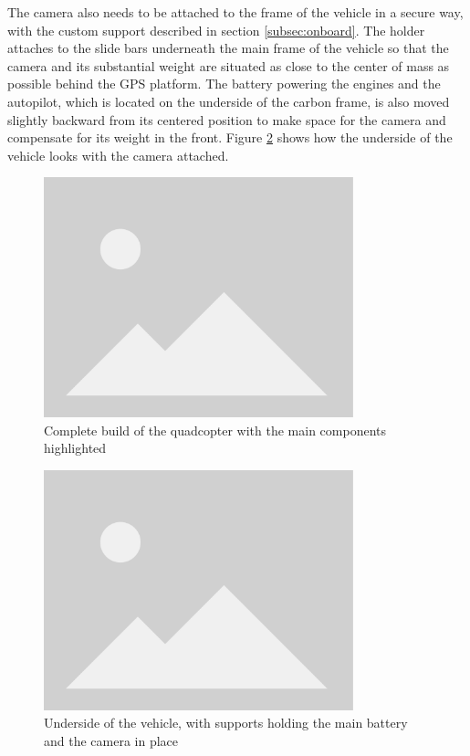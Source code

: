 The camera also needs to be attached to the frame of the vehicle in a secure way, with the custom support described in section \ref{subsec:onboard}.
The holder attaches to the slide bars underneath the main frame of the vehicle so that the camera and its substantial weight are situated as close to the center of mass as possible behind the GPS platform.
The battery powering the engines and the autopilot, which is located on the underside of the carbon frame, is also moved slightly backward from its centered position to make space for the camera and compensate for its weight in the front.
Figure \ref{fig:camera-holder-closeup} shows how the underside of the vehicle looks with the camera attached.

\begin{figure}
  \centering
  \includegraphics[width=0.8\textwidth, keepaspectratio]{img/placeholder.png}
  \caption{Complete build of the quadcopter with the main components highlighted}\label{fig:full-build}
\end{figure}

\begin{figure}
  \centering
  \includegraphics[width=0.8\textwidth, keepaspectratio]{img/placeholder.png}
  \caption{Underside of the vehicle, with supports holding the main battery and the camera in place}
  \label{fig:camera-holder-closeup}
\end{figure}


